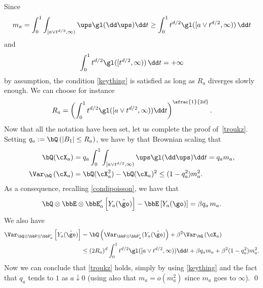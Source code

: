 Since
\[
m_a =\int^1_0 \int_{[a\vee t^{d/2}, \infty)} \ups \gl(\dd \ups) \dd t\ge \int^1_0 t^{d/2} \gl([a\vee t^{d/2}, \infty))\,\dd t
\]
and
\[
\int^1_0 t^{d/2} \gl([t^{d/2}, \infty))\,\dd t =+\infty
\]
by assumption, the condition
\eqref{keything} is satisfied as long as $R_a$ diverges slowly enough.
We can choose for instance
\[
R_a= \left(\int^1_0 t^{d/2} \gl([a\vee t^{d/2}, \infty))\dd t\right)^{\sfrac{1}{2d}}.
\]
Now that all the notation have been set, let us complete the proof of~\eqref{troukz}.
Setting $q_a:=\bQ\left(|B_1|\leq R_a \right)$, we have by that Brownian scaling that
\begin{equation}
\begin{split}\label{largus}
\bQ(\cX_a)&= q_a \int^1_0\int_{[a\vee t^{d/2}, \infty)} \ups \gl(\dd \ups) \dd t = q_a m_a,\\
\Var_{\bQ}\left(\cX_a\right)&= \bQ(\cX^2_a)- \bQ(\cX_a)^2 \le (1- q_a^2) m_a ^2.
\end{split}
\end{equation}
As a consequence, recalling \eqref{condipoisson}, we have that
\begin{equation}
\bQ\otimes\bbE\otimes \bbE'_a\left[ Y_a(\hat \go)\right]- \bbE \left[ Y_a(\go)\right]= \beta q_a\, m_a.
\end{equation}
We also have
\begin{align*}
\Var_{\bQ\otimes \bbP\otimes \bbP'_a}\left[ Y_a(\hat \go)\right]&= \bQ\left(\Var_{\bbP\otimes \bbP'_a}(Y_a(\hat \go) \right)+\beta^2 \Var_{\bQ}\left(\cX_a\right)\\
&\le (2R_a)^d\int^1_0 t^{d/2} \gl([a\vee t^{d/2}, \infty))\dd t +\beta q_a m_a +
\beta^2 (1- q_a^2) m_a^2.
\end{align*}
Now we can conclude that \eqref{troukz} holds, simply by using \eqref{keything} and the fact that $q_a$ tends to $1$
as $a\downarrow 0$ (using also that $m_a =o(m_a^2)$ since $m_a$ goes to $\infty$).
\qed

